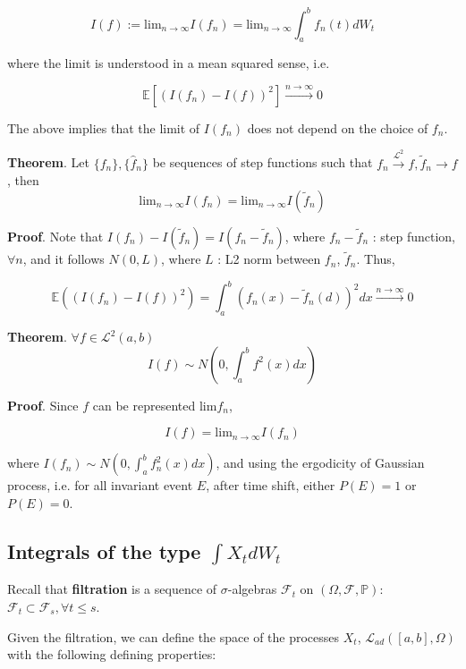 \documentclass[12pt]{article}
\theoremstyle{nonumberbreak}
\begin{document}
$$
I(f) := \mathrm{lim}_{n\to\infty} I(f_n) = \mathrm{lim}_{n\to\infty} \int_a^b f_n(t) dW_t
$$

where the limit is understood in a mean squared sense, i.e.

$$
\mathbb{E} \left[ \left( I(f_n) - I(f) \right)^2 \right] \overset{n\to\infty}{\to} 0
$$

The above implies that the limit of $I(f_n)$ does not depend on the choice of $f_n$.


\begin{theorem}
\textbf{Theorem}. Let $\{ f_n \}, \{ \hat{f}_n \}$ be sequences of step functions such that $f_n \overset{\mathcal{L}^2}{\to} f, \tilde{f}_n \to f$, then
$$
\mathrm{lim}_{n\to\infty} I(f_n) = \mathrm{lim}_{n\to\infty} I(\tilde{f}_n)
$$
\end{theorem}

\textbf{Proof}. Note that $I(f_n) - I(\tilde{f}_n) = I (f_n - \tilde{f}_n)$, where $f_n - \tilde{f}_n$ : step function, $\forall n$, and it follows $N \left( 0, L \right)$, where $L$ : L2 norm between $f_n$, $\tilde{f}_n$. Thus,

$$
\mathbb{E} \left( \left( I(f_n) - I(f) \right)^2 \right) = \int_a^b \left( f_n(x) - \tilde{f}_n(d) \right)^2 dx \overset{n\to\infty}{\to} 0
$$



\begin{theorem}
\textbf{Theorem}. $\forall f \in \mathcal{L}^2 (a,b)$
$$
I(f) \sim N \left(0, \int_a^b f^2(x) dx \right)
$$
\end{theorem}

\textbf{Proof}. Since $f$ can be represented $\mathrm{lim} f_n$,

$$
I(f) = \mathrm{lim}_{n\to\infty} I(f_n)
$$

where $I(f_n) \sim N \left(0, \int_a^b f_n^2(x) dx \right)$, and using the ergodicity of Gaussian process, i.e. for all invariant event $E$, after time shift, either $P(E) = 1$ or $P(E) = 0$.


\subsection{Integrals of the type $\int X_t d W_t$}

Recall that \textbf{filtration} is a sequence of $\sigma$-algebras $\mathcal{F}_t$ on $(\Omega, \mathcal{F}, \mathbb{P})$: $\mathcal{F}_t \subset \mathcal{F}_s, \forall t \le s$. 

Given the filtration, we can define the space of the processes $X_t$, $\mathcal{L}_{ad} \left( [a,b], \Omega \right)$ with the following defining properties:
\end{document}
